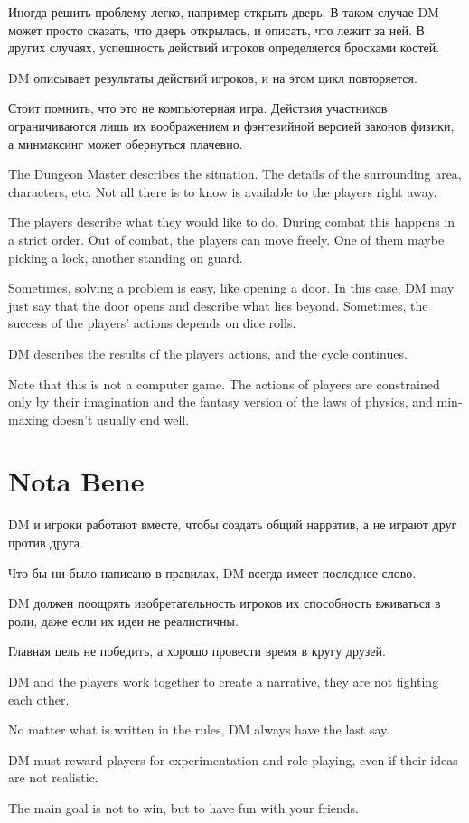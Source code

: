 \documentclass[a5paper,11pt]{book}
\begin{document}
\begin{multicols}{2}
\begin{ru}
Иногда решить проблему легко, например открыть дверь. В таком случае DM может просто сказать, что дверь открылась, и описать, что лежит за ней. В других случаях, успешность действий игроков определяется бросками костей.

DM описывает результаты действий игроков, и на этом цикл повторяется.

Стоит помнить, что это не компьютерная игра. Действия участников ограничиваются лишь их воображением и фэнтезийной версией законов физики, а минмаксинг может обернуться плачевно.
\end{ru}

\begin{en}
The Dungeon Master describes the situation. The details of the surrounding area, characters, etc. Not all there is to know is available to the players right away.

The players describe what they would like to do. During combat this happens in a strict order. Out of combat, the players can move freely. One of them maybe picking a lock, another standing on guard.

Sometimes, solving a problem is easy, like opening a door. In this case, DM may just say that the door opens and describe what lies beyond. Sometimes, the success of the players' actions depends on dice rolls.

DM describes the results of the players actions, and the cycle continues.

Note that this is not a computer game. The actions of players are constrained only by their imagination and the fantasy version of the laws of physics, and min-maxing doesn't usually end well.
\end{en}

\section{Nota Bene}
\begin{ru}
DM и игроки работают вместе, чтобы создать общий нарратив, а не играют друг против друга.

Что бы ни было написано в правилах, DM всегда имеет последнее слово.

DM должен поощрять изобретательность игроков их способность вживаться в роли, даже если их идеи не реалистичны.

Главная цель не победить, а хорошо провести время в кругу друзей.
\end{ru}

\begin{en}
DM and the players work together to create a narrative, they are not fighting each other.

No matter what is written in the rules, DM always have the last say.

DM must reward players for experimentation and role-playing, even if their ideas are not realistic.

The main goal is not to win, but to have fun with your friends.
\end{en}

\end{multicols}
\end{document}
